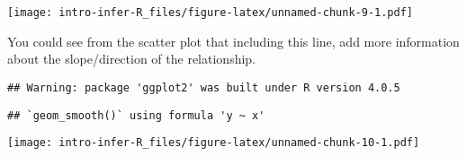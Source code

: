 \documentclass[
]{article}
\begin{document}
\texttt{[image: intro-infer-R\_files/figure-latex/unnamed-chunk-9-1.pdf]}

You could see from the scatter plot that including this line, add more
information about the slope/direction of the relationship.

\begin{verbatim}
## Warning: package 'ggplot2' was built under R version 4.0.5
\end{verbatim}

\begin{verbatim}
## `geom_smooth()` using formula 'y ~ x'
\end{verbatim}

\texttt{[image: intro-infer-R\_files/figure-latex/unnamed-chunk-10-1.pdf]}
\end{document}
